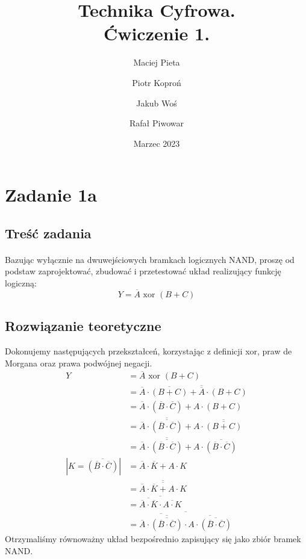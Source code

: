 \documentclass{article}
\author{Maciej Pieta \and Piotr Koproń \and Jakub Woś \and Rafał Piwowar}
\date{Marzec 2023}
\title{Technika Cyfrowa. \\ Ćwiczenie 1.}
\begin{document}
\maketitle
\newpage
\section{Zadanie 1a}
\subsection{Treść zadania}
\paragraph{}
Bazując wyłącznie na dwuwejściowych bramkach logicznych NAND, proszę od podstaw  zaprojektować, zbudować i przetestować układ realizujący funkcję logiczną:
\begin{equation}
Y = \overline{A} \text{ xor } (B + C)
\end{equation}
\subsection{Rozwiązanie teoretyczne}
Dokonujemy następujących przekształceń, korzystając z definicji xor, praw de Morgana oraz prawa podwójnej negacji.
\begin{align*}
 Y &= \overline{A} \text{ xor } (B + C) \\
 &= \overline{A} \cdot \overline{(B+C)} + \overline{\overline{A}} \cdot (B+C)\\
&= \overline{A} \cdot (\overline{B} \cdot \overline{C}) + A \cdot (B+C)\\
&= \overline{A} \cdot \overline{\overline{(\overline{B} \cdot \overline{C})}} + A \cdot \overline{\overline{(B+C)}} \\
&= \overline{A} \cdot \overline{\overline{(\overline{B} \cdot \overline{C})}} + A \cdot \overline{(\overline{B} \cdot \overline{C})} \\
|K = \overline{(\overline{B} \cdot \overline{C})}| &= \overline{A} \cdot \overline{K} + A \cdot K \\
&= \overline{\overline{\overline{A} \cdot \overline{K} + A \cdot K}} \\
&= \overline{\overline{\overline{A} \cdot \overline{K}} \cdot \overline{A \cdot K}} \\
&= \overline{\overline{\overline{A} \cdot \overline{\overline{(\overline{B} \cdot \overline{C})}}} \cdot \overline{A \cdot \overline{(\overline{B} \cdot \overline{C})}}}
\end{align*}
Otrzymaliśmy równoważny układ bezpośrednio zapisujący się jako zbiór bramek NAND.
\newpage
\end{document}
